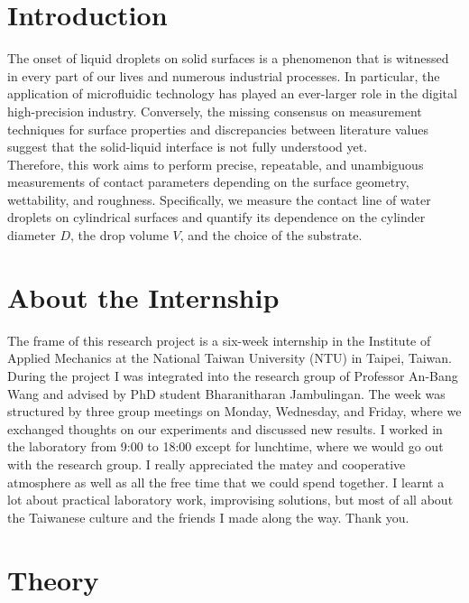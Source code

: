 
\section{Introduction}
    The onset of liquid droplets on solid surfaces is a phenomenon that is witnessed in every part of our lives and numerous industrial processes. In particular, the application of microfluidic technology has played an ever-larger role in the digital high-precision industry. Conversely, the missing consensus on measurement techniques for surface properties and discrepancies between literature values suggest that the solid-liquid interface is not fully understood yet. \cite{00_Project-Description} \\

    Therefore, this work aims to perform precise, repeatable, and unambiguous measurements of contact parameters depending on the surface geometry, wettability, and roughness. Specifically, we measure the contact line of water droplets on cylindrical surfaces and quantify its dependence on the cylinder diameter $D$, the drop volume $V$, and the choice of the substrate. \\


\section{About the Internship}

    The frame of this research project is a six-week internship in the Institute of Applied Mechanics at the National Taiwan University (NTU) in Taipei, Taiwan. During the project I was integrated into the research group of Professor An-Bang Wang and advised by PhD student Bharanitharan Jambulingan. The week was structured by three group meetings on Monday, Wednesday, and Friday, where we exchanged thoughts on our experiments and discussed new results. I worked in the laboratory from 9:00 to 18:00 except for lunchtime, where we would go out with the research group. I really appreciated the matey and cooperative atmosphere as well as all the free time that we could spend together. I learnt a lot about practical laboratory work, improvising solutions, but most of all about the Taiwanese culture and the friends I made along the way. Thank you.

\section{Theory}
    \label{sec:theory}

